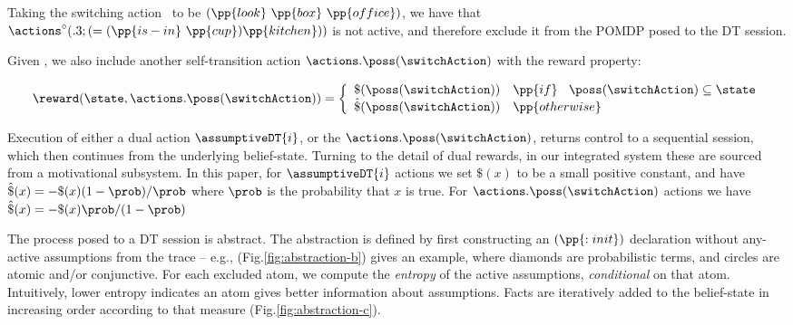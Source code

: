 \noindent Taking the switching action \switchAction\ to be
$(\pp{look}~\pp{box}~\pp{office})$, we have that
$\actions^{\circ}(.3;(=(\pp{is-in}~\pp{cup})\pp{kitchen}))$ is not
active, and therefore exclude it from the
POMDP posed to the DT session. 

Given \switchAction, we also include another self-transition action
$\actions.\poss(\switchAction)$ with the reward property:

\[
\reward(\state, \actions.\poss(\switchAction)) = \bigg\{ \begin{array}{ll}
\$(\poss(\switchAction)) & \pp{if}~\;\; \poss(\switchAction) \subseteq \state \\
\hat\$(\poss(\switchAction)) & \pp{otherwise} \\
\end{array}
\]

Execution of either a dual action $\assumptiveDT{i}$, or the
$\actions.\poss(\switchAction)$, returns control to a sequential
session, which then continues from the underlying
belief-state. Turning to the detail of dual rewards, in our integrated
system these are sourced from a motivational subsystem. In this paper,
for $\assumptiveDT{i}$ actions we set $\$(x)$ to be a small positive
constant, and have $\hat\$(x)= - \$(x)(1 - \prob) / \prob$ where
$\prob$ is the probability that $x$ is true. For
$\actions.\poss(\switchAction)$ actions we have $\hat\$(x)= -
\$(x)\prob/(1-\prob)$





The process posed to a DT session is abstract. The abstraction is
defined by first constructing an $(\pp{:init})$ declaration without
any-active assumptions from the trace -- e.g.,
(Fig.\ref{fig:abstraction-b}) gives an example, where diamonds are
probabilistic terms, and circles are atomic and/or conjunctive.
For each excluded atom, we compute the {\em entropy} of the active
assumptions, {\em conditional} on that atom. Intuitively, lower
entropy indicates an atom gives better information about
assumptions. Facts are iteratively added to the belief-state in
increasing order according to that measure
(Fig.\ref{fig:abstraction-c}).







